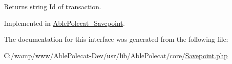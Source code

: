 \begin{DoxyReturn}{Returns}
string Id of transaction. 
\end{DoxyReturn}


Implemented in \hyperlink{class_able_polecat___savepoint_a83a4c2954e4da6dad24e596265e33d0a}{Able\+Polecat\+\_\+\+Savepoint}.



The documentation for this interface was generated from the following file\+:\begin{DoxyCompactItemize}
\item 
C\+:/wamp/www/\+Able\+Polecat-\/\+Dev/usr/lib/\+Able\+Polecat/core/\hyperlink{_savepoint_8php}{Savepoint.\+php}\end{DoxyCompactItemize}
